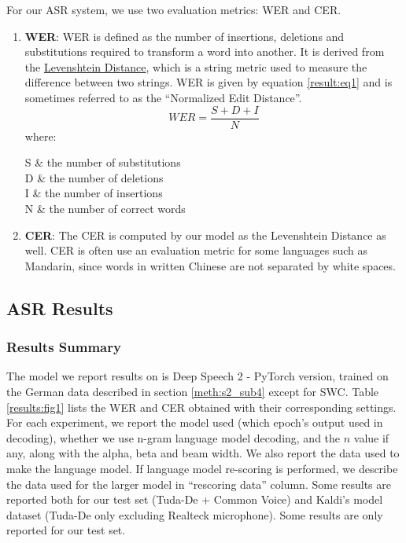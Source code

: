 For our \ac{ASR} system, we use two evaluation metrics: \ac{WER} and \ac{CER}.
\begin{enumerate}
	\item \textbf{\acf{WER}}: \ac{WER} is defined as the number of insertions, deletions and substitutions required to transform a word into another. It is derived from the \href{https://en.wikipedia.org/wiki/Levenshtein_distance}{Levenshtein Distance}, which is a string metric used to measure the difference between two strings. \ac{WER} is given by equation \ref{result:eq1} and is sometimes referred to as the \enquote{Normalized Edit Distance}.
	\begin{equation}
	\label{result:eq1}
		WER = \frac{S+D+I}{N}
	\end{equation}
	where:
	\begin{conditions}
		S     &   the number of substitutions \\
		D     &   the number of deletions \\   
		I     &   the number of insertions \\
		N     &   the number of correct words \\
	\end{conditions}
	\item \textbf{\acf{CER}}: The \ac{CER} is computed by our model as the Levenshtein Distance as well. \ac{CER} is often use an evaluation metric for some languages such as Mandarin, since words in written Chinese are not separated by white spaces.
\end{enumerate}



\subsection{ASR Results}
\label{res:s1_sub2}


\subsubsection{Results Summary}
\label{res:s1_sub2_subsub1}

The model we report results on is Deep Speech 2 - PyTorch version, trained on the German data described in section \ref{meth:s2_sub4} except for \ac{SWC}.
Table \ref{results:fig1} lists the \ac{WER} and \ac{CER} obtained with their corresponding settings. For each experiment, we report the model used (which epoch's output used in decoding), whether we use n-gram language model decoding, and the $n$ value if any, along with the alpha, beta and beam width. We also report the data used to make the language model. If language model re-scoring is performed, we describe the data used for the larger model in \enquote{rescoring data} column. Some results are reported both for our test set (Tuda-De + Common Voice) and Kaldi's model dataset (Tuda-De only excluding Realteck microphone). Some results are only reported for our test set. 


